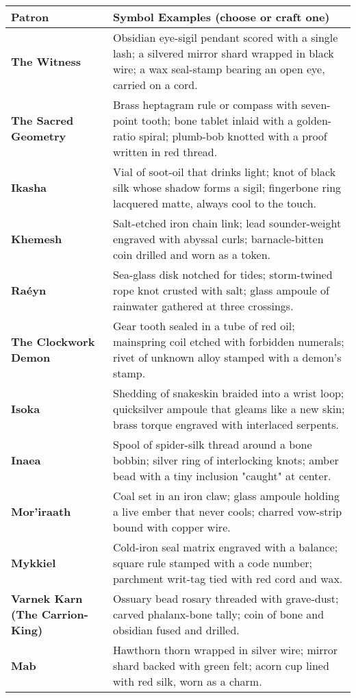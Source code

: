 \documentclass[12pt,twoside]{book}
\begin{document}
\begin{table}[htbp]
\centering
\small
\renewcommand{\arraystretch}{1.15}
\begin{tabular}{>{\bfseries}p{4.0cm} >{\raggedright\arraybackslash}p{10.8cm}}
\toprule
\textbf{Patron} & \textbf{Symbol Examples (choose or craft one)} \\
\midrule
The Witness & Obsidian eye-sigil pendant scored with a single lash; a silvered mirror shard wrapped in black wire; a wax seal-stamp bearing an open eye, carried on a cord. \\
The Sacred Geometry & Brass heptagram rule or compass with seven-point tooth; bone tablet inlaid with a golden-ratio spiral; plumb-bob knotted with a proof written in red thread. \\
Ikasha & Vial of soot-oil that drinks light; knot of black silk whose shadow forms a sigil; fingerbone ring lacquered matte, always cool to the touch. \\
Khemesh & Salt-etched iron chain link; lead sounder-weight engraved with abyssal curls; barnacle-bitten coin drilled and worn as a token. \\
Raéyn & Sea-glass disk notched for tides; storm-twined rope knot crusted with salt; glass ampoule of rainwater gathered at three crossings. \\
The Clockwork Demon & Gear tooth sealed in a tube of red oil; mainspring coil etched with forbidden numerals; rivet of unknown alloy stamped with a demon's stamp. \\
Isoka & Shedding of snakeskin braided into a wrist loop; quicksilver ampoule that gleams like a new skin; brass torque engraved with interlaced serpents. \\
Inaea & Spool of spider-silk thread around a bone bobbin; silver ring of interlocking knots; amber bead with a tiny inclusion "caught" at center. \\
Mor'iraath & Coal set in an iron claw; glass ampoule holding a live ember that never cools; charred vow-strip bound with copper wire. \\
Mykkiel & Cold-iron seal matrix engraved with a balance; square rule stamped with a code number; parchment writ-tag tied with red cord and wax. \\
Varnek Karn (The Carrion-King) & Ossuary bead rosary threaded with grave-dust; carved phalanx-bone tally; coin of bone and obsidian fused and drilled. \\
Mab & Hawthorn thorn wrapped in silver wire; mirror shard backed with green felt; acorn cup lined with red silk, worn as a charm. \\

\end{tabular}
\end{table}
\end{document}
